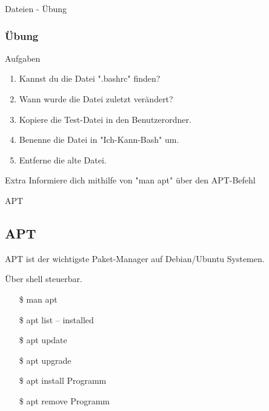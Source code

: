 \begin{frame}{Dateien - Übung}
    \subsubsection{Übung}\label{subsubsec:übung}

    \begin{alertblock}{Aufgaben}
        \begin{enumerate}
            \item Kannst du die Datei ".bashrc" finden?\pause
            \item Wann wurde die Datei zuletzt verändert?\pause
            \item Kopiere die Test-Datei in den Benutzerordner.\pause
            \item Benenne die Datei in "Ich-Kann-Bash" um.\pause
            \item Entferne die alte Datei.
        \end{enumerate}
    \end{alertblock}
    \pause

    \vspace{0.5cm}
    \begin{alertblock}{Extra}
        Informiere dich mithilfe von "man apt" über den APT-Befehl
    \end{alertblock}

\end{frame}

\begin{frame}{APT}
    \subsection{APT}\label{subsec:apt}

    APT ist der wichtigste Paket-Manager auf Debian/Ubuntu Systemen.
    \pause

    \textrightarrow Über shell steuerbar.
    \pause

    \begin{itemize}
        \item[\$] man apt\pause
        \item[\$] apt list -- installed\pause
        \item[\$] apt update\pause
        \item[\$] apt upgrade\pause
        \item[\$] apt install Programm\pause
        \item[\$] apt remove Programm
    \end{itemize}

\end{frame}

